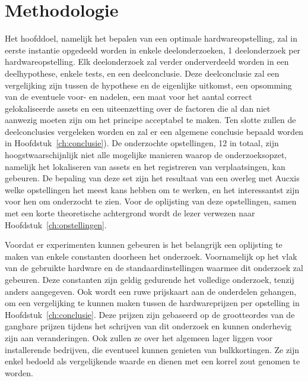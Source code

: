 
\chapter{Methodologie}
\label{ch:methodologie}

Het hoofddoel, namelijk het bepalen van een optimale hardwareopstelling, zal in eerste instantie opgedeeld worden in enkele deelonderzoeken, 1 deelonderzoek per hardwareopstelling. Elk deelonderzoek zal verder onderverdeeld worden in een deelhypothese, enkele tests, en een deelconclusie. Deze deelconclusie zal een vergelijking zijn tussen de hypothese en de eigenlijke uitkomst, een opsomming van de eventuele voor- en nadelen, een maat voor het aantal correct gelokaliseerde assets en een uiteenzetting over de factoren die al dan niet aanwezig moeten zijn om het principe acceptabel te maken. Ten slotte zullen de deelconclusies vergeleken worden en zal er een algemene conclusie bepaald worden in Hoofdstuk~\ref{ch:conclusie}). De onderzochte opstellingen, 12 in totaal, zijn hoogstwaarschijnlijk niet alle mogelijke manieren waarop de onderzoeksopzet, namelijk het lokaliseren van assets en het registreren van verplaatsingen, kan gebeuren. De bepaling van deze set zijn het resultaat van een overleg met Aucxis welke opstellingen het meest kans hebben om te werken, en het interessantst zijn voor hen om onderzocht te zien. Voor de oplijsting van deze opstellingen, samen met een korte theoretische achtergrond wordt de lezer verwezen naar Hoofdstuk~\ref{ch:opstellingen}.

Voordat er experimenten kunnen gebeuren is het belangrijk een oplijsting te maken van enkele constanten doorheen het onderzoek. Voornamelijk op het vlak van de gebruikte hardware en de standaardinstellingen waarmee dit onderzoek zal gebeuren. Deze constanten zijn geldig gedurende het volledige onderzoek, tenzij anders aangegeven. Ook wordt een ruwe prijskaart aan de onderdelen gehangen, om een vergelijking te kunnen maken tussen de hardwareprijzen per opstelling in Hoofdstuk~\ref{ch:conclusie}. Deze prijzen zijn gebaseerd op de grootteordes van de gangbare prijzen tijdens het schrijven van dit onderzoek en kunnen onderhevig zijn aan veranderingen. Ook zullen ze over het algemeen lager liggen voor installerende bedrijven, die eventueel kunnen genieten van bulkkortingen. Ze zijn enkel bedoeld als vergelijkende waarde en dienen met een korrel zout genomen te worden.

